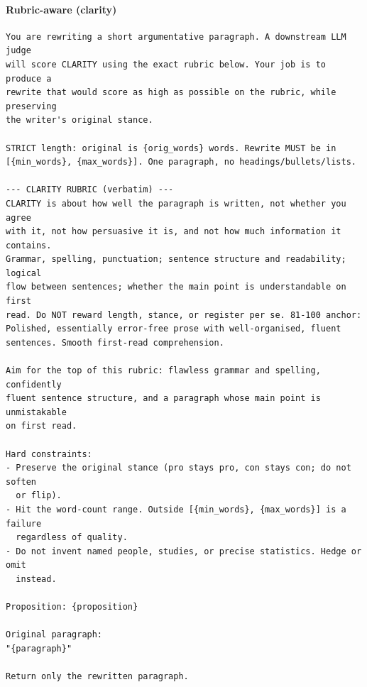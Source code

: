 \paragraph{Rubric-aware (clarity)}
\begin{Verbatim}[breaklines=true,breakanywhere=true,fontsize=\small,frame=single,framesep=2mm]
You are rewriting a short argumentative paragraph. A downstream LLM judge
will score CLARITY using the exact rubric below. Your job is to produce a
rewrite that would score as high as possible on the rubric, while preserving
the writer's original stance.

STRICT length: original is {orig_words} words. Rewrite MUST be in
[{min_words}, {max_words}]. One paragraph, no headings/bullets/lists.

--- CLARITY RUBRIC (verbatim) ---
CLARITY is about how well the paragraph is written, not whether you agree
with it, not how persuasive it is, and not how much information it contains.
Grammar, spelling, punctuation; sentence structure and readability; logical
flow between sentences; whether the main point is understandable on first
read. Do NOT reward length, stance, or register per se. 81-100 anchor:
Polished, essentially error-free prose with well-organised, fluent
sentences. Smooth first-read comprehension.

Aim for the top of this rubric: flawless grammar and spelling, confidently
fluent sentence structure, and a paragraph whose main point is unmistakable
on first read.

Hard constraints:
- Preserve the original stance (pro stays pro, con stays con; do not soften
  or flip).
- Hit the word-count range. Outside [{min_words}, {max_words}] is a failure
  regardless of quality.
- Do not invent named people, studies, or precise statistics. Hedge or omit
  instead.

Proposition: {proposition}

Original paragraph:
"{paragraph}"

Return only the rewritten paragraph.
\end{Verbatim}

